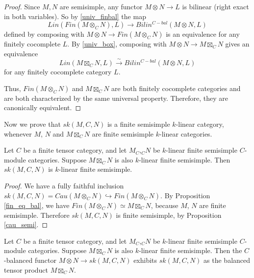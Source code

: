 \begin{proof}

  \noindent Since $M,N$ are semisimple, any functor $M\otimes N\to L$ is
  bilinear (right exact in both variables).
  So by \ref{univ_finbal} the map \[Lin(Fin(M \otimes_{C} N), L) \to
  Bilin^{C-bal}(M \otimes N, L)\] defined by composing with $M\otimes N\to
  Fin(M\otimes_C N)$ is an equivalence for any finitely cocomplete $L$.
  By \ref{univ_box}, composing with $M\otimes N\to M\boxtimes_C N$ gives
  an equivalence \[Lin(M \boxtimes_{C} N, L) \xrightarrow{\sim}
  Bilin^{C-bal}(M \otimes N, L)\] for any finitely cocomplete category $L$.

  Thus, $Fin(M\otimes_C N)$ and $M \boxtimes_{C} N$ are both finitely cocomplete
  categories and are both characterized by the same universal property.
  Therefore, they are canonically equivalent.
\end{proof}

Now we prove that $sk(M,C,N)$ is a finite semisimple $k$-linear category,
whenever $M$, $N$ and $M\boxtimes_C N$ are finite semisimple $k$-linear
categories.

\begin{lemma}\label{semisimple}
  Let $C$ be a finite tensor category, and let $M_C$,$_{C}N$ be $k$-linear finite
  semisimple $C$-module categories. Suppose $M\boxtimes_C N$ is also
  $k$-linear finite semisimple.
  Then $sk(M,C,N)$ is $k$-linear finite
  semisimple.
\end{lemma}

\begin{proof}
  We have a fully faithful inclusion $sk(M,C,N)=Cau(M\otimes_C
  N)\hookrightarrow Fin(M\otimes_C N)$. By Proposition \ref{fin_eq_bal}, we
  have $Fin(M\otimes_C N)\simeq M\boxtimes_C N$, because $M$, $N$ are finite
  semisimple. Therefore $sk(M,C,N)$ is finite semisimple, by
  Proposition \ref{cau_semi}.
\end{proof}

\begin{lemma}\label{sk_bal}
  Let $C$ be a finite tensor category, and let $M_C$,$_{C}N$ be $k$-linear finite
  semisimple $C$-module categories. Suppose $M\boxtimes_C N$ is also
  $k$-linear finite semisimple. Then the $C$-balanced functor $M\otimes N\to
  sk(M,C,N)$ exhibits $sk(M,C,N)$ as the balanced tensor product $M\boxtimes_C
  N$.
\end{lemma}

